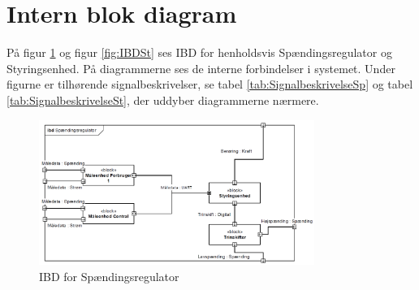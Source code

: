
\section{Intern blok diagram}
På figur \ref{fig:IBDSp} og figur \ref{fig:IBDSt} ses IBD for henholdsvis Spændingsregulator og Styringsenhed. På diagrammerne ses de interne forbindelser i systemet. Under figurne er tilhørende signalbeskrivelser, se tabel \ref{tab:SignalbeskrivelseSp} og tabel \ref{tab:SignalbeskrivelseSt}, der uddyber diagrammerne nærmere.

\begin{figure}[htbp] %
	\centering
	\includegraphics[width=0.8\textwidth]{Figure/IBDSpaendingsregulator1}
	\caption{IBD for Spændingsregulator}
	\label{fig:IBDSp}
\end{figure}

